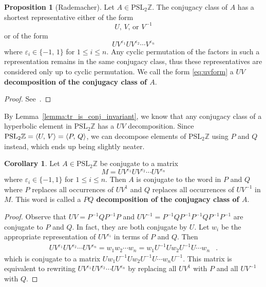 \documentclass[12pt,twoside]{reedthesis}
\theoremstyle{definition}
\newtheorem{cor}[thm]{Corollary}
\newtheorem{prop}[thm]{Proposition}
\newcommand{\Z}{\mathbb{Z}}
\newcommand{\PSLZ}{\mathrm{PSL}_2{\Z}}
\newcommand{\defnphrase}[1]{\textbf{#1}}
\DeclarePairedDelimiter\ang{\langle}{\rangle}
\begin{document}
\begin{prop}[Rademacher]
  Let $A \in \PSLZ$.
  The conjugacy class of $A$ has a shortest representative either of the form
  \begin{equation}\label{eq:uvform_elliptic}
    \text{$U$, $V$, or $V^{-1}$}
  \end{equation}
  or of the form
  \begin{equation}\label{eq:uvform}
    U V^{\varepsilon_1} U V^{\varepsilon_2} \cdots V^{\varepsilon_{n}}
  \end{equation}
  where $\varepsilon_i \in \{-1,\, 1\}$ for $1 \leq i \leq n$.
  Any cyclic permutation of the factors in such a representation remains in the same conjugacy class, thus these representatives are considered only up to cyclic permutation.
  We call the form \eqref{eq:uvform} a \defnphrase{$UV$ decomposition of the conjugacy class of $A$}.
\end{prop}

\begin{proof}
  See~\cite[56--57]{rademacher1972}.
\end{proof}

By Lemma~\ref{lemma:tr_is_conj_invariant}, we know that any conjugacy class of a hyperbolic element in $\PSLZ$ has a $UV$ decomposition.
Since $\PSLZ = \ang{U,\, V} = \ang{P,\, Q}$, we can decompose elements of $\PSLZ$ using $P$ and $Q$ instead, which ends up being slightly neater.

\vspace{0.5em}  %
\begin{cor}\label{prop:pq_decomposition}
  Let $A \in \PSLZ$ be conjugate to a matrix
  \begin{equation*}
    M = UV^{\varepsilon_1} UV^{\varepsilon_2} \cdots UV^{\varepsilon_n}
  \end{equation*}
  where $\varepsilon_i \in \{-1, 1\}$ for $1 \leq i \leq n$.
  Then $A$ is conjugate to the word in $P$ and $Q$ where $P$ replaces all occurrences of $UV^1$ and $Q$ replaces all occurrences of $UV^{-1}$ in $M$.
  This word is called a \defnphrase{$PQ$ decomposition of the conjugacy class of $A$}.
\end{cor}

\begin{proof}
  Observe that $UV = P^{-1}QP^{-1}P$ and $UV^{-1} = P^{-1}QP^{-1}P^{-1}QP^{-1}P^{-1}$ are conjugate to $P$ and $Q$.
  In fact, they are both conjugate by $U$.
  Let $w_i$ be the appropriate representation of $UV^{\varepsilon_i}$ in terms of $P$ and $Q$.
  Then
  \begin{align*}
    UV^{\varepsilon_1} UV^{\varepsilon_2} \cdots UV^{\varepsilon_n} = w_1 w_2 \cdots w_n = w_1 U^{-1} U w_2 U^{-1} U \cdots w_n
    &.
  \end{align*}
  which is conjugate to a matrix $U w_1 U^{-1} U w_2 U^{-1} U \cdots w_n U^{-1}$.
  This matrix is equivalent to rewriting $UV^{\varepsilon_1} UV^{\varepsilon_2} \cdots UV^{\varepsilon_n}$ by replacing all $UV^1$ with $P$ and all $UV^{-1}$ with $Q$.
\end{proof}
\end{document}
